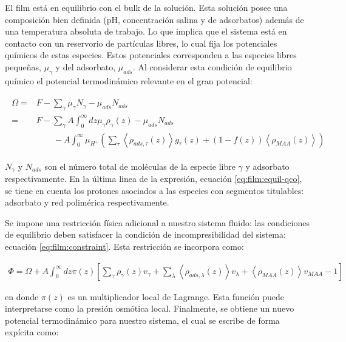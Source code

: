 El film est\'a en equilibrio con el bulk de la soluci\'on. Esta soluci\'on posee una composici\'on bien definida (pH, concentraci\'on salina y de adsorbatos) adem\'as de una temperatura absoluta de trabajo. Lo que implica que el sistema est\'a en contacto con un reservorio de part\'iculas libres, lo cual fija los potenciales qu\'imicos de estas especies. Estos potenciales corresponden a las especies libres peque\~nas, $\mu_\gamma$ y del adsorbato, $\mu_{ads}$. Al considerar esta condici\'on de equilibrio qu\'imico el potencial termodin\'amico relevante en el gran potencial: 

\begin{align}
	\begin{aligned}
		\Omega = &F - \sum_\gamma \mu_\gamma N_\gamma -  \mu_{ads} N_{ads} \\
			= &F -\sum_\gamma A\int_0^\infty dz \mu_\gamma \rho_\gamma(z) -  \mu_{ads} N_{ads}  \\
			& \qquad -A\int_0^\infty \mu_{H^+} \left( \sum_\tau\left< \rho_{ads,\tau}(z) \right>g_\tau(z) + (1-f(z))\left< \rho_{MAA}(z) \right> \right )
			\end{aligned}
		\label{eq:film:equil-qco}
\end{align}

\noindent $N_\gamma$ y $ N_{ads}$ son el n\'umero total de mol\'eculas de la especie libre $\gamma$ y adsorbato respectivamente. En la \'ultima linea de la expresi\'on, ecuaci\'on \ref{eq:film:equil-qco}, se tiene en cuenta los protones asociados a las especies con segmentos titulables: adsorbato y red polim\'erica respectivamente.


Se impone una restricci\'on f\'isica adicional a nuestro sistema fluido: las condiciones de equilibrio deben satisfacer la condici\'on de incompresibilidad del sistema: ecuaci\'on \ref{eq:film:constraint}.  Esta restricci\'on se incorpora como:

\begin{align}
	\Phi = \Omega +A \int_0^\infty dz\pi(z){\left[\sum_{\gamma}\rho_\gamma(z) v_\gamma + \sum_\lambda{\left<\rho_{ads,\lambda}(z)\right>v_\lambda} + \left<\rho_{MAA}(z)\right>v_{MAA} -1 \right]}
\end{align}


\noindent en donde $\pi(z)$ es un multiplicador local de Lagrange.  Esta funci\'on puede interpretarse como la presi\'on osm\'otica local. Finalmente, se obtiene un nuevo potencial termodin\'amico para nuestro sistema, el cual se escribe de forma exp\'icita como:
 
